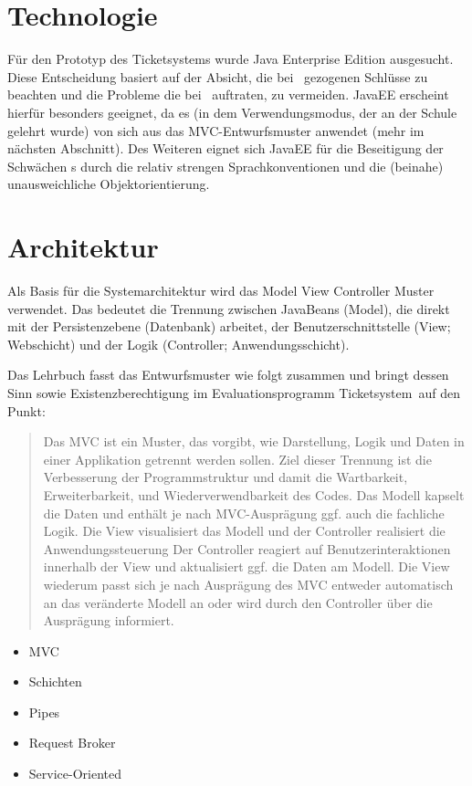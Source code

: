 \section{Technologie}
Für den Prototyp des Ticketsystems wurde Java Enterprise Edition ausgesucht. Diese Entscheidung basiert auf der Absicht, die bei \getOst\ gezogenen Schlüsse zu beachten und die Probleme die bei \getOst\ auftraten, zu vermeiden. JavaEE erscheint hierfür besonders geeignet, da es (in dem Verwendungsmodus, der an der Schule gelehrt wurde) von sich aus das MVC-Entwurfsmuster anwendet (mehr im nächsten Abschnitt). Des Weiteren eignet sich JavaEE für die Beseitigung der Schwächen \getOst s durch die relativ strengen Sprachkonventionen und die (beinahe) unausweichliche Objektorientierung.

\section{Architektur}
Als Basis für die Systemarchitektur wird das Model View Controller Muster verwendet. Das bedeutet die Trennung zwischen JavaBeans (Model), die direkt mit der Persistenzebene (Datenbank) arbeitet, der Benutzerschnittstelle (View; Webschicht) und der Logik (Controller; Anwendungsschicht).

Das Lehrbuch fasst das Entwurfsmuster wie folgt zusammen und bringt dessen Sinn sowie Existenzberechtigung im Evaluationsprogramm \glqq Ticketsystem\grqq\ auf den Punkt:
\blockcquote[2015]{JavaEE ABC}{
Das MVC ist ein Muster, das vorgibt, wie Darstellung, Logik und Daten in einer Applikation getrennt werden sollen. Ziel dieser Trennung ist die Verbesserung der Programmstruktur und damit die Wartbarkeit, Erweiterbarkeit, und Wiederverwendbarkeit des Codes.
Das Modell kapselt die Daten und enthält je nach MVC-Ausprägung ggf. auch die fachliche Logik. Die View visualisiert das Modell und der Controller realisiert die Anwendungssteuerung Der Controller reagiert auf Benutzerinteraktionen innerhalb der View und aktualisiert ggf. die Daten am Modell. Die View wiederum passt sich je nach Ausprägung des MVC entweder automatisch an das veränderte Modell an oder wird durch den Controller über die Ausprägung informiert.
}

\begin{itemize}
	\item MVC
	\item Schichten
	\item Pipes
	\item Request Broker
	\item Service-Oriented
\end{itemize}

